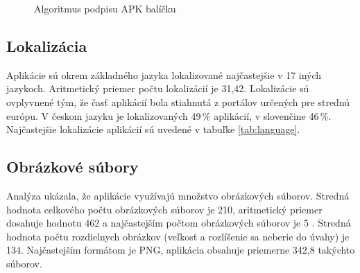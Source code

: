 \begin{figure}[!htbp]
\centering
{}
\label{fig:signAlg}
\caption{Algoritmus podpisu APK balíčku}
\end{figure}

\subsection*{Lokalizácia}
Aplikácie sú okrem základného jazyka lokalizované najčastejšie v 17 iných jazykoch. Aritmetický priemer počtu lokalizácií je 31,42. Lokalizácie sú ovplyvnené tým, že časť aplikácií bola stiahnutá z portálov určených pre strednú európu. V českom jazyku je lokalizovaných 49\,\% aplikácií, v slovenčine 46\,\%. Najčastejšie lokalizácie aplikácií sú uvedené v tabuľke \ref{tab:language}.


\subsection*{Obrázkové súbory}
Analýza ukázala, že aplikácie využívajú množstvo obrázkových súborov. Stredná hodnota celkového počtu obrázkových súborov je 210, aritmetický priemer dosahuje hodnotu 462 a najčastejším počtom obrázkových súborov je 5 . Stredná hodnota počtu rozdielnych obrázkov (veľkosť a rozlíšenie sa neberie do úvahy) je 134. Najčastejším formátom je PNG, aplikácia obsahuje priemerne 342,8 takýchto súborov.